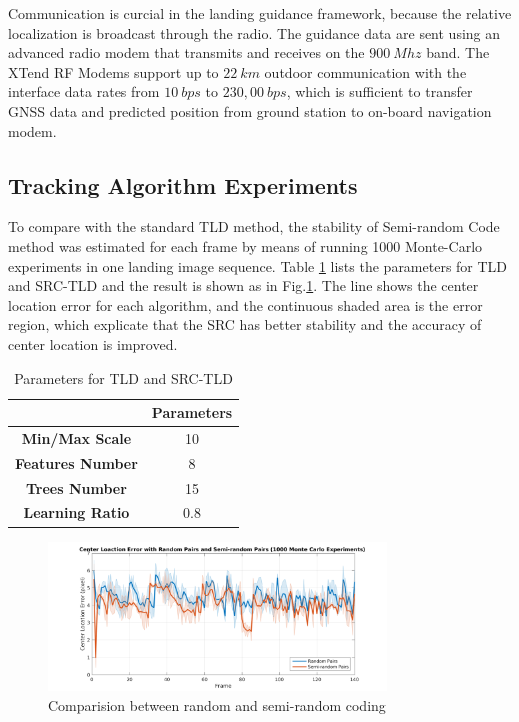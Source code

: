 Communication is curcial in the landing guidance framework, because the relative localization is broadcast through the radio. The guidance data are sent using an advanced radio modem that transmits and receives on the $900\ Mhz$ band. The XTend RF Modems support up to $22\ km$ outdoor communication with the interface data rates from $10\ bps$ to $230,00\ bps$, which is sufficient to transfer GNSS data and predicted position from ground station to on-board navigation modem. 




\subsection{Tracking Algorithm Experiments}
To compare with the standard TLD method, the stability of Semi-random Code method was estimated for each frame by means of running 1000 Monte-Carlo experiments in one landing image sequence. Table \ref{lab:TLD_params} lists the parameters for TLD and SRC-TLD and the result is shown as in Fig.\ref{fig:chp04_24_random_semi_random_monte_carlo}. The line shows the center location error for each algorithm, and the continuous shaded area is the error region, which explicate that the SRC has better stability and the accuracy of center location is improved. 

\begin{table}[!th]
	\centering
	\caption{Parameters for TLD and SRC-TLD}
	\label{lab:TLD_params}
	\begin{tabular}{cc}
		\hline
		& \textbf{Parameters} \\ \hline
		 \textbf{Min/Max Scale} & 10 \\
		 \textbf{Features Number} & 8 \\
		 \textbf{Trees Number} & 15 \\
		 \textbf{Learning Ratio} & 0.8 \\ \hline
	\end{tabular}
\end{table}

\begin{figure}[!th]
	\centering
	\includegraphics[width=0.8\textwidth]{Figs/chp04_24_random_semi_random_monte_carlo.pdf}
	\caption{Comparision between random and semi-random coding}
	\label{fig:chp04_24_random_semi_random_monte_carlo}    
\end{figure}

